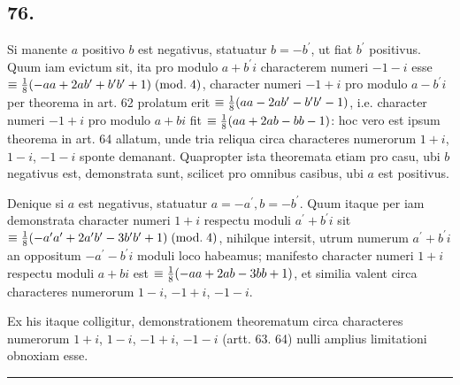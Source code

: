 \documentclass[twoside,12pt]{memoir}
\renewcommand{\pmod}[1]{\;(\textrm{mod.}\;#1)}
\let\oldfrac\frac
\def\frac#1#2{\mathchoice{\tfrac{#1}{#2}}{\oldfrac{#1}{#2}}{\genfrac{}{}{}{2}{#1}{#2\mathstrut}}{\genfrac{}{}{}{3}{#1}{#2\mathstrut}}}
\begin{document}
\subsection*{76.}
 
Si manente \(a\) positivo \(b\) est negativus, statuatur \(b=-b^{\prime}\), ut fiat \(b^{\prime}\) positivus. Quum iam evictum sit, ita pro modulo \(a+b^{\prime} i\) characterem numeri \(-1-i\) esse \(\equiv \frac{1}{8}(-a a+2 a b^{\prime}+b^{\prime} b^{\prime}+1)\pmod{4}\), character numeri \(-1+i\) pro modulo \(a-b^{\prime} i\) per theorema in art. 62 prolatum erit \(\equiv \frac{1}{8}(a a-2 a b^{\prime}-b^{\prime} b^{\prime}-1)\), i.e. character numeri \(-1+i\) pro modulo \(a+b i\) fit \(\equiv \frac{1}{8}(a a+2 a b-b b-1)\): hoc vero est ipsum theorema in art. 64 allatum, unde tria reliqua circa characteres numerorum \(1+i\), \(1-i\), \(-1-i\) sponte demanant. Quapropter ista theoremata etiam pro casu, ubi \(b\) negativus est, demonstrata sunt, scilicet pro omnibus casibus, ubi \(a\) est positivus.
 
Denique si \(a\) est negativus, statuatur \(a=-a^{\prime}, b=-b^{\prime}\). Quum itaque per iam demonstrata character numeri \(1+i\) respectu moduli \(a^{\prime}+b^{\prime} i\) sit \(\equiv \frac{1}{8}(-a^{\prime} a^{\prime}+2 a^{\prime} b^{\prime}-3 b^{\prime} b^{\prime}+1)\pmod{4}\), nihilque intersit, utrum numerum \(a^{\prime}+b^{\prime} i\) an oppositum \(-a^{\prime}-b^{\prime} i\) moduli loco habeamus; manifesto character numeri \(1+i\) respectu moduli \(a+b i\) est \(\equiv \frac{1}{8}(-a a+2 a b-3 b b+1)\), et similia valent circa characteres numerorum \(1-i\), \(-1+i\), \(-1-i\).
 
Ex his itaque colligitur, demonstrationem theorematum circa characteres numerorum \(1+i\), \(1-i\), \(-1+i\), \(-1-i\) (artt. 63. 64) nulli amplius limitationi obnoxiam esse.
\begin{center}\rule{1.5in}{0.5pt}\end{center}
\end{document}
